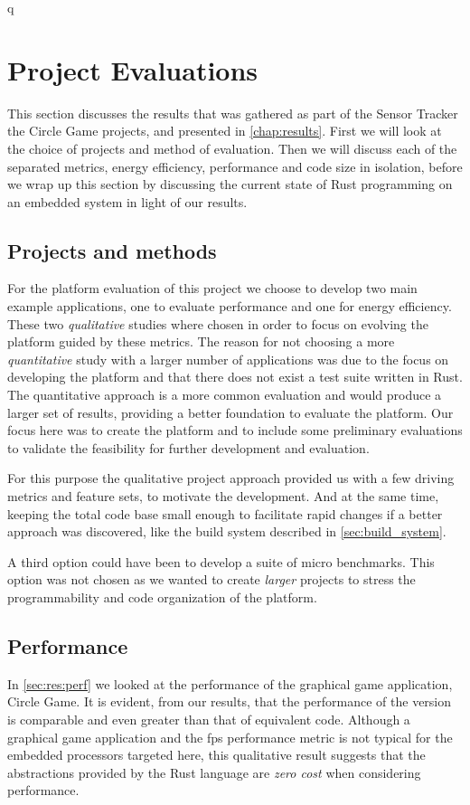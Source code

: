 q%

\section{Project Evaluations}
\label{sec:disc:project_evaluations}

This section discusses the results that was gathered as part of the Sensor Tracker the Circle Game projects, and presented in \autoref{chap:results}.
First we will look at the choice of projects and method of evaluation.
Then we will discuss each of the separated metrics, energy efficiency, performance and code size in isolation, before we wrap up this section by discussing the current state of Rust programming on an embedded system in light of our results.

\subsection{Projects and methods}

For the platform evaluation of this project we choose to develop two main example applications, one to evaluate performance and one for energy efficiency.
These two \emph{qualitative} studies where chosen in order to focus on evolving the platform guided by these metrics.
The reason for not choosing a more \emph{quantitative} study with a larger number of applications was due to the focus on developing the platform and that there does not exist a test suite written in Rust.
The quantitative approach is a more common evaluation and would produce a larger set of results, providing a better foundation to evaluate the platform.
Our focus here was to create the platform and to include some preliminary evaluations to validate the feasibility for further development and evaluation.

For this purpose the qualitative project approach provided us with a few driving metrics and feature sets, to motivate the development.
And at the same time, keeping the total code base small enough to facilitate rapid changes if a better approach was discovered, like the build system described in \autoref{sec:build_system}.

A third option could have been to develop a suite of micro benchmarks.
This option was not chosen as we wanted to create \emph{larger} projects to stress the programmability and code organization of the platform.

\subsection{Performance}
In \autoref{sec:res:perf} we looked at the performance of the graphical game application, Circle Game.
It is evident, from our results, that the performance of the {\rust} version is comparable and even greater than that of equivalent {\C} code.
Although a graphical game application and the \gls{fps} performance metric is not typical for the embedded processors targeted here, this qualitative result suggests that the abstractions provided by the Rust language are \emph{zero cost} when considering performance.

